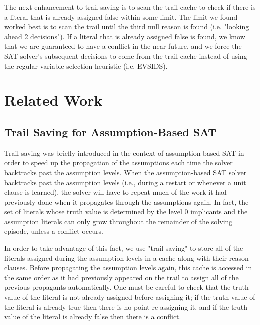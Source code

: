 \documentclass{article}
\begin{document}
The next enhancement to trail saving is to scan the trail cache to check if there is a literal that is already assigned false within some limit. The limit we found worked best is to scan the trail until the third null reason is found (i.e. "looking ahead 2 decisions"). If a literal that is already assigned false is found, we know that we are guaranteed to have a conflict in the near future, and we force the SAT solver's subsequent decisions to come from the trail cache instead of using the regular variable selection heuristic (i.e. EVSIDS).

\section{Related Work}
\subsection{Trail Saving for Assumption-Based SAT}
Trail saving was briefly introduced in the context of assumption-based SAT \cite{DBLP:conf/sat/HickeyB19} in order to speed up the propagation of the assumptions each time the solver backtracks past the assumption levels. When the assumption-based SAT solver backtracks past the assumption levels (i.e., during a restart or whenever a unit clause is learned), the solver will have to repeat much of the work it had previously done when it propagates through the assumptions again. In fact, the set of literals whose truth value is determined by the level 0 implicants and the assumption literals can only grow throughout the remainder of the solving episode, unless a conflict occurs.

In order to take advantage of this fact, we use "trail saving" to store all of the literals assigned during the assumption levels in a cache along with their reason clauses. Before propagating the assumption levels again, this cache is accessed in the same order as it had previously appeared on the trail to assign all of the previous propagants automatically. One must be careful to check that the truth value of the literal is not already assigned before assigning it; if the truth value of the literal is already true then there is no point re-assigning it, and if the truth value of the literal is already false then there is a conflict.
\end{document}
